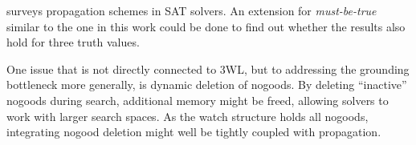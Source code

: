 \documentclass{vutinfth} %
\newcommand{\mbt}{must-be-true\xspace}
\begin{document}
\cite{effstructs} surveys propagation schemes in SAT solvers. An extension for \emph{\mbt} similar to the one in this work could be done to find out whether the results also hold for three truth values.

One issue that is not directly connected to 3WL, but to addressing the grounding bottleneck more generally, is dynamic deletion of nogoods. By deleting \enquote{inactive} nogoods during search, additional memory might be freed, allowing solvers to work with larger search spaces. As the watch structure holds all nogoods, integrating nogood deletion might well be tightly coupled with propagation.

\backmatter
\listoffigures*
\listoftables*
\listofalgorithms


\begingroup
\renewcommand{\addcontentsline}[3]{}%

\endgroup
\end{document}
